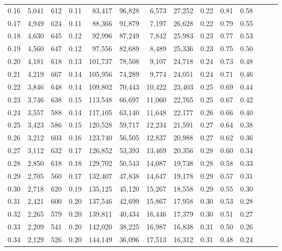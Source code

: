 \begin{tabular}{rrrrrrrrrrrrrr}
0.16 &  5,041 &  612 &  0.11 &   83,417 &   96,828 &   6,573 &  27,252 &  0.22 &  0.81 &      0.58 \\
0.17 &  4,949 &  624 &  0.11 &   88,366 &   91,879 &   7,197 &  26,628 &  0.22 &  0.79 &      0.55 \\
0.18 &  4,630 &  645 &  0.12 &   92,996 &   87,249 &   7,842 &  25,983 &  0.23 &  0.77 &      0.53 \\
0.19 &  4,560 &  647 &  0.12 &   97,556 &   82,689 &   8,489 &  25,336 &  0.23 &  0.75 &      0.50 \\
0.20 &  4,181 &  618 &  0.13 &  101,737 &   78,508 &   9,107 &  24,718 &  0.24 &  0.73 &      0.48 \\
0.21 &  4,219 &  667 &  0.14 &  105,956 &   74,289 &   9,774 &  24,051 &  0.24 &  0.71 &      0.46 \\
0.22 &  3,846 &  648 &  0.14 &  109,802 &   70,443 &  10,422 &  23,403 &  0.25 &  0.69 &      0.44 \\
0.23 &  3,746 &  638 &  0.15 &  113,548 &   66,697 &  11,060 &  22,765 &  0.25 &  0.67 &      0.42 \\
0.24 &  3,557 &  588 &  0.14 &  117,105 &   63,140 &  11,648 &  22,177 &  0.26 &  0.66 &      0.40 \\
0.25 &  3,423 &  586 &  0.15 &  120,528 &   59,717 &  12,234 &  21,591 &  0.27 &  0.64 &      0.38 \\
0.26 &  3,212 &  603 &  0.16 &  123,740 &   56,505 &  12,837 &  20,988 &  0.27 &  0.62 &      0.36 \\
0.27 &  3,112 &  632 &  0.17 &  126,852 &   53,393 &  13,469 &  20,356 &  0.28 &  0.60 &      0.34 \\
0.28 &  2,850 &  618 &  0.18 &  129,702 &   50,543 &  14,087 &  19,738 &  0.28 &  0.58 &      0.33 \\
0.29 &  2,705 &  560 &  0.17 &  132,407 &   47,838 &  14,647 &  19,178 &  0.29 &  0.57 &      0.31 \\
0.30 &  2,718 &  620 &  0.19 &  135,125 &   45,120 &  15,267 &  18,558 &  0.29 &  0.55 &      0.30 \\
0.31 &  2,421 &  600 &  0.20 &  137,546 &   42,699 &  15,867 &  17,958 &  0.30 &  0.53 &      0.28 \\
0.32 &  2,265 &  579 &  0.20 &  139,811 &   40,434 &  16,446 &  17,379 &  0.30 &  0.51 &      0.27 \\
0.33 &  2,209 &  541 &  0.20 &  142,020 &   38,225 &  16,987 &  16,838 &  0.31 &  0.50 &      0.26 \\
0.34 &  2,129 &  526 &  0.20 &  144,149 &   36,096 &  17,513 &  16,312 &  0.31 &  0.48 &      0.24 \\

\end{tabular}
